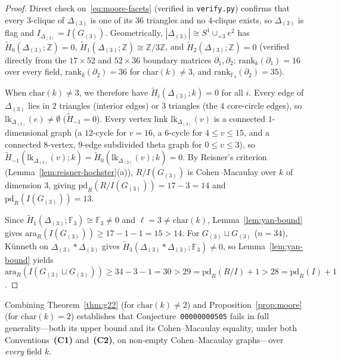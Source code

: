 \documentclass[11pt,a4paper]{amsart}
\theoremstyle{plain}
\theoremstyle{definition}
\newcommand{\ara}{\mathrm{ara}}
\newcommand{\pd}{\mathrm{pd}}
\newcommand{\lk}{\mathrm{lk}}
\newcommand{\FF}{\mathbb{F}}
\newcommand{\ZZ}{\mathbb{Z}}
\begin{document}
\begin{proof}
Direct check on~\eqref{eq:moore-facets} (verified in \texttt{verify.py}) confirms that every $3$-clique of $\Delta_{(3)}$ is one of its $36$ triangles and no $4$-clique exists, so $\Delta_{(3)}$ is flag and $I_{\Delta_{(3)}} = I(G_{(3)})$. Geometrically, $|\Delta_{(3)}| \cong S^1 \cup_{\times 3} e^2$ has $\widetilde{H}_0(\Delta_{(3)};\ZZ) = 0$, $\widetilde{H}_1(\Delta_{(3)};\ZZ) \cong \ZZ/3\ZZ$, and $\widetilde{H}_2(\Delta_{(3)};\ZZ) = 0$ (verified directly from the $17 \times 52$ and $52 \times 36$ boundary matrices $\partial_1, \partial_2$: $\mathrm{rank}_k(\partial_1) = 16$ over every field, $\mathrm{rank}_k(\partial_2) = 36$ for $\mathrm{char}(k) \neq 3$, and $\mathrm{rank}_{\FF_3}(\partial_2) = 35$).

When $\mathrm{char}(k) \neq 3$, we therefore have $\widetilde{H}_i(\Delta_{(3)}; k) = 0$ for all $i$. Every edge of $\Delta_{(3)}$ lies in $2$ triangles (interior edges) or $3$ triangles (the $4$ core-circle edges), so $\lk_{\Delta_{(3)}}(e) \neq \emptyset$ ($\widetilde{H}_{-1} = 0$). Every vertex link $\lk_{\Delta_{(3)}}(v)$ is a connected $1$-dimensional graph (a $12$-cycle for $v = 16$, a $6$-cycle for $4 \le v \le 15$, and a connected $8$-vertex, $9$-edge subdivided theta graph for $0 \le v \le 3$), so $\widetilde{H}_{-1}(\lk_{\Delta_{(3)}}(v); k) = \widetilde{H}_0(\lk_{\Delta_{(3)}}(v); k) = 0$. By Reisner's criterion (Lemma~\ref{lem:reisner-hochster}(a)), $R/I(G_{(3)})$ is Cohen--Macaulay over $k$ of dimension $3$, giving $\pd_R(R/I(G_{(3)})) = 17 - 3 = 14$ and $\pd_R(I(G_{(3)})) = 13$.

Since $\widetilde{H}_1(\Delta_{(3)}; \FF_3) \cong \FF_3 \neq 0$ and $\ell = 3 \neq \mathrm{char}(k)$, Lemma~\ref{lem:yan-bound} gives $\ara_R(I(G_{(3)})) \ge 17 - 1 - 1 = 15 > 14$. For $G_{(3)} \sqcup G_{(3)}$ ($n = 34$), K\"unneth on $\Delta_{(3)} * \Delta_{(3)}$ gives $\widetilde{H}_3(\Delta_{(3)} * \Delta_{(3)}; \FF_3) \neq 0$, so Lemma~\ref{lem:yan-bound} yields $\ara_R(I(G_{(3)} \sqcup G_{(3)})) \ge 34 - 3 - 1 = 30 > 29 = \pd_R(R/I) + 1 > 28 = \pd_R(I) + 1$.
\end{proof}

Combining Theorem~\ref{thm:g22} (for $\mathrm{char}(k) \neq 2$) and Proposition~\ref{prop:moore} (for $\mathrm{char}(k) = 2$) establishes that Conjecture~\texttt{00000000505} fails in full generality---both its upper bound and its Cohen--Macaulay equality, under both Conventions~\textbf{(C1)} and~\textbf{(C2)}, on non-empty Cohen--Macaulay graphs---over \emph{every} field $k$.
\end{document}
